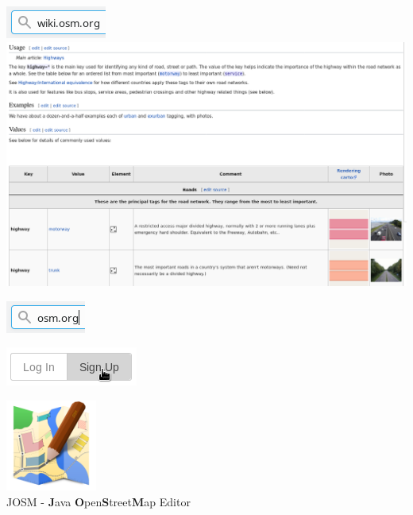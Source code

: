 \documentclass{beamer}
\begin{document}
	\begin{frame}
		\vfill
		\begin{center}
			\includegraphics{images/osm-wiki-org}\\
			\vspace{0.5cm}
			\includegraphics[width=\linewidth]{images/osm-wiki}
		\end{center}
		\vfill
	\end{frame}

	\begin{frame}
		\vfill
		\begin{center}
			\includegraphics{images/osm-org}
		\end{center}
		\vfill
	\end{frame}

	\begin{frame}
		\vfill
		\begin{center}
			\includegraphics{images/osm-sign-up}
		\end{center}
		\vfill
	\end{frame}

	\begin{frame}
		\vfill
		\begin{center}
			\includegraphics[width=3cm]{images/josm}\\
			JOSM - \textbf{J}ava \textbf{O}pen\textbf{S}treet\textbf{M}ap Editor
		\end{center}
		\vfill
	\end{frame}
\end{document}
